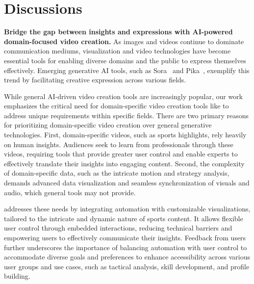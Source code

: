 \section{Discussions}




\noindent\textbf{Bridge the gap between insights and expressions with AI-powered domain-focused video creation.}
As images and videos continue to dominate communication mediums, visualization and video technologies have become essential tools for enabling diverse domains and the public to express themselves effectively. Emerging generative AI tools, such as Sora~\cite{sora} and Pika~\cite{pika}, exemplify this trend by facilitating creative expression across various fields.

While general AI-driven video creation tools are increasingly popular, our work emphasizes the critical need for domain-specific video creation tools like \SB{} to address unique requirements within specific fields. There are two primary reasons for prioritizing domain-specific video creation over general generative technologies.
% 
First, domain-specific videos, such as sports highlights, rely heavily on human insights. Audiences seek to learn from professionals through these videos, requiring tools that provide greater user control and enable experts to effectively translate their insights into engaging content. 
% 
Second, the complexity of domain-specific data, such as the intricate motion and strategy analysis, demands advanced data visualization and seamless synchronization of visuals and audio, which general tools may not provide. 

\SB{} addresses these needs by integrating automation with customizable visualizations, tailored to the intricate and dynamic nature of sports content. It allows flexible user control through embedded interactions, 
reducing technical barriers and empowering users to effectively communicate their insights. Feedback from users further underscores the importance of balancing automation with user control to accommodate diverse goals and preferences to enhance accessibility across various user groups and use cases, such as tactical analysis, skill development, and profile building. 


